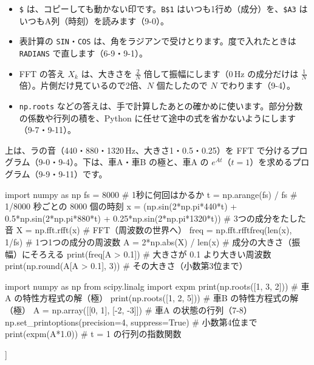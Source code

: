 \begin{itemize}[leftmargin=1.4\zw, itemsep=2pt, topsep=4pt, label={\color{\bkTT}●}]
\item \texttt{\$} は、コピーしても動かない印です。\texttt{B\$1} はいつも1行め（成分）を、\texttt{\$A3} はいつもA列（時刻）を読みます（9-0）。
\item 表計算の \texttt{SIN}・\texttt{COS} は、角をラジアンで受けとります。度で入れたときは \texttt{RADIANS} で直します（6-9・9-1）。
\item FFT の答え $X_k$ は、大きさを $\frac{2}{N}$ 倍して振幅にします（0\,Hz の成分だけは $\frac{1}{N}$ 倍）。片側だけ見ているので2倍、$N$ 個たしたので $N$ でわります（9-4）。
\item \texttt{np.roots} などの答えは、手で計算したあとの確かめに使います。部分分数の係数や行列の積を、Python に任せて途中の式を省かないようにします（9-7・9-11）。
\end{itemize}

{\small 上は、ラの音（440・880・1320\,Hz、大きさ1・0.5・0.25）を FFT で分けるプログラム（9-0・9-4）。下は、車A・車B の極と、車A の $e^{At}$（$t=1$）を求めるプログラム（9-9・9-11）です。}\par\vspace{1mm}
\begin{bkcode}[Python]
import numpy as np
fs = 8000                       \# 1秒に何回はかるか
t = np.arange(fs) / fs          \# 1/8000 秒ごとの 8000 個の時刻
x = (np.sin(2*np.pi*440*t) + 0.5*np.sin(2*np.pi*880*t)
     + 0.25*np.sin(2*np.pi*1320*t))   \# 3つの成分をたした音
X = np.fft.rfft(x)              \# FFT（周波数の世界へ）
freq = np.fft.rfftfreq(len(x), 1/fs)  \# 1つ1つの成分の周波数
A = 2*np.abs(X) / len(x)        \# 成分の大きさ（振幅）にそろえる
print(freq[A > 0.1])            \# 大きさが 0.1 より大きい周波数
print(np.round(A[A > 0.1], 3))  \# その大きさ（小数第3位まで）
\end{bkcode}
\begin{bkcodeout}[実行結果]
[ 440.  880. 1320.]
[1.   0.5  0.25]
\end{bkcodeout}
\vspace{1mm}
\begin{bkcode}[Python]
import numpy as np
from scipy.linalg import expm
print(np.roots([1, 3, 2]))      \# 車A の特性方程式の解（極）
print(np.roots([1, 2, 5]))      \# 車B の特性方程式の解（極）
A = np.array([[0, 1],
              [-2, -3]])        \# 車A の状態の行列（7-8）
np.set\_printoptions(precision=4, suppress=True)  \# 小数第4位まで
print(expm(A*1.0))              \# t = 1 の行列の指数関数
\end{bkcode}
\begin{bkcodeout}[実行結果]
[-2. -1.]
[-1.+2.j -1.-2.j]
[[ 0.6004  0.2325]
 [-0.4651 -0.0972]]
\end{bkcodeout}
\vspace{2mm}

